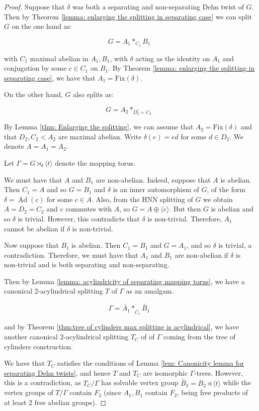 \documentclass{amsart}
\DeclareMathOperator{\Ad}{Ad}
\theoremstyle{plain}
\theoremstyle{definition}
\theoremstyle{remark}
\begin{document}
\begin{proof}
    Suppose that $\delta$ was both a separating and non-separating Dehn twist of $G$. Then by Theorem \ref{lemma: enlarging the splitting in separating case} we can split $G$ on the one hand as: 

    $$G = A_1 *_{C_1} B_1$$ 

    with $C_1$ maximal abelian in $A_1, B_1$, with $\delta$ acting as the identity on $A_1$ and conjugation by some $c \in C_1$ on $B_1$. By Theorem \ref{lemma: enlarging the splitting in separating case}, we have that $A_1 = \mathrm{Fix}(\delta)$. 

    On the other hand, $G$ also splits as:

    $$G = {A_2}*_{D_2^e = C_2}$$ 
    
     By Lemma \ref{thm: Enlarging the splitting}, we can assume that $A_2 = \mathrm{Fix}(\delta)$ and that $D_2, C_2 < A_2$ are maximal abelian. Write $\delta(e) = ed$ for some $d \in D_2$. We denote $A = A_1 =A_2$.

    Let $\Gamma = G \rtimes_{\delta} \langle t \rangle$ denote the mapping torus.

    We must have that $A$ and $B_1$ are non-abelian. Indeed, suppose that $A$ is abelian. Then $C_1 = A$ and so $G = B_1$ and $\delta$ is an inner automorphism of $G$, of the form $\delta = \Ad(c)$ for some $c \in A$. Also, from the HNN splitting of $G$ we obtain $A = D_2 = C_2$ and $e$ commutes with $A$, so $G = A \oplus \langle e \rangle$. But then $G$ is abelian and so $\delta$ is trivial. However, this contradicts that $\delta$ is non-trivial. Therefore, $A_1$ cannot be abelian if $\delta$ is non-trivial.

    Now suppose that $B_1$ is abelian. Then $C_1 = B_1$ and $G = A_1$, and so $\delta$ is trivial, a contradiction. Therefore, we must have that $A_1$ and $B_1$ are non-abelian if $\delta$ is non-trivial and is both separating and non-separating. 

    Then by Lemma \ref{lemma: acylindricity of separating mapping torus}, we have a canonical 2-acylindrical splitting $T$ of $\Gamma$ as an amalgam. 

    $$\Gamma = \tilde{A_1} *_{\tilde{C_1}}  \tilde{B_1}$$

    and by Theorem \ref{thm:tree of cylinders max splitting is acylindrical}, we have another canonical 2-acylindrical splitting $T_C$ of of $\Gamma$ coming from the tree of cylinders construction. 

    We have that $T_C$ satisfies the conditions of Lemma \ref{lem: Canonicity lemma for separating Dehn twists}, and hence $T$ and $T_C$ are isomorphic $\Gamma$-trees. However, this is a contradiction, as $T_C/\Gamma$ has solvable vertex group $\tilde{B_2} = B_2 \rtimes \langle t \rangle$ while the vertex groups of $T/\Gamma$ contain $F_2$ (since $A_1, B_1$ contain $F_2$, being free products of at least 2 free abelian groups). 

\end{proof}
\end{document}
